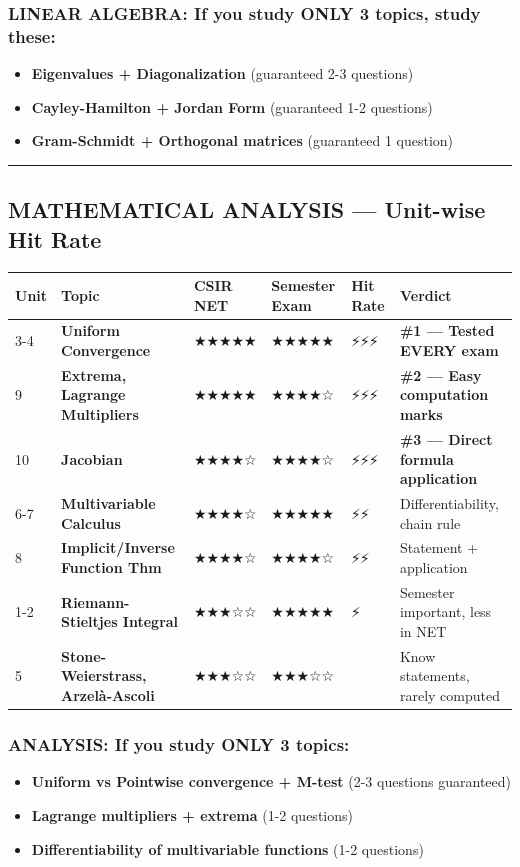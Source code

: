 \documentclass[12pt,a4paper,openany]{book}
\begin{document}
{\subsubsection{ LINEAR ALGEBRA: If you study ONLY 3 topics, study these:}
\begin{itemize}
  \item \textbf{Eigenvalues + Diagonalization} (guaranteed 2-3 questions)
  \item \textbf{Cayley-Hamilton + Jordan Form} (guaranteed 1-2 questions)
  \item \textbf{Gram-Schmidt + Orthogonal matrices} (guaranteed 1 question)
\end{itemize}

\bigskip\noindent\rule{\textwidth}{0.4pt}\bigskip

\subsection{ MATHEMATICAL ANALYSIS — Unit-wise Hit Rate}

\begin{center}
\begin{tabular}{|l|l|l|l|l|l|}
\hline
\textbf{Unit} & \textbf{Topic} & \textbf{CSIR NET} & \textbf{Semester Exam} & \textbf{Hit Rate} & \textbf{Verdict} \\
\hline
3-4 & \textbf{Uniform Convergence} & ★★★★★ & ★★★★★ & ⚡⚡⚡ & \textbf{\#1 — Tested EVERY exam} \\
\hline
9 & \textbf{Extrema, Lagrange Multipliers} & ★★★★★ & ★★★★☆ & ⚡⚡⚡ & \textbf{\#2 — Easy computation marks} \\
\hline
10 & \textbf{Jacobian} & ★★★★☆ & ★★★★☆ & ⚡⚡⚡ & \textbf{\#3 — Direct formula application} \\
\hline
6-7 & \textbf{Multivariable Calculus} & ★★★★☆ & ★★★★★ & ⚡⚡ & Differentiability, chain rule \\
\hline
8 & \textbf{Implicit/Inverse Function Thm} & ★★★★☆ & ★★★★☆ & ⚡⚡ & Statement + application \\
\hline
1-2 & \textbf{Riemann-Stieltjes Integral} & ★★★☆☆ & ★★★★★ & ⚡ & Semester important, less in NET \\
\hline
5 & \textbf{Stone-Weierstrass, Arzelà-Ascoli} & ★★★☆☆ & ★★★☆☆ &  & Know statements, rarely computed \\
\hline
\end{tabular}
\end{center}

\subsubsection{ ANALYSIS: If you study ONLY 3 topics:}
\begin{itemize}
  \item \textbf{Uniform vs Pointwise convergence + M-test} (2-3 questions guaranteed)
  \item \textbf{Lagrange multipliers + extrema} (1-2 questions)
  \item \textbf{Differentiability of multivariable functions} (1-2 questions)
\end{itemize}

}
\end{document}
